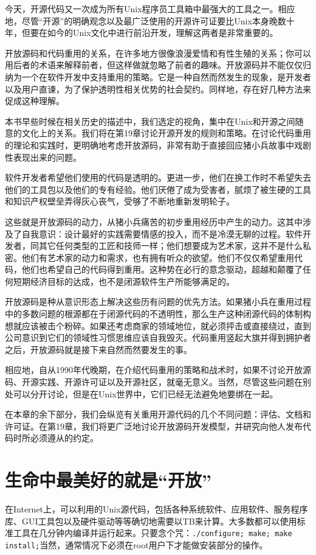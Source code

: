 \documentclass[12pt,oneside]{book}
\begin{document}
\begin{common-format}
今天，开源代码又一次成为所有Unix程序员工具箱中最强大的工具之一。相应地，尽管“开源”的明确观念以及最广泛使用的开源许可证要比Unix本身晚数十年，但要在如今的Unix文化中进行前沿开发，理解这两者是非常重要的。

开放源码和代码重用的关系，在许多地方很像浪漫爱情和有性生殖的关系；你可以用后者的术语来解释前者，但这样做就忽略了前者的趣味。开放源码并不能仅仅归纳为一个在软件开发中支持重用的策略。它是一种自然而然发生的现象，是开发者以及用户直谏，为了保护透明性相关优势的社会契约。同样地，存在好几种方法来促成这种理解。

本书早些时候在相关历史的描述中，我们选定的视角，集中在Unix和开源之间随意的文化上的关系。我们将在第19章讨论开源开发的规则和策略。在讨论代码重用的理论和实践时，更明确地考虑开放源码，非常有助于直接回应猪小兵故事中戏剧性表现出来的问题。

软件开发者希望他们使用的代码是透明的。更进一步，他们在换工作时不希望失去他们的工具包以及他们的专有经验。他们厌倦了成为受害者，腻烦了被生硬的工具和知识产权壁垒弄得灰心丧气，受够了不断地重新发明轮子。

这些就是开放源码的动力，从猪小兵痛苦的初步重用经历中产生的动力。这其中涉及了自我意识：设计最好的实践需要情感的投入，而不是冷漠无聊的过程。软件开发者，同其它任何类型的工匠和技师一样；他们想要成为艺术家，这并不是什么私密。他们有艺术家的动力和需求，也有拥有听众的欲望。他们不仅仅希望重用代码，他们也希望自己的代码得到重用。这种势在必行的意念驱动，超越和颠覆了任何短期经济目标的达成，也不是闭源软件生产所能够满足的。

开放源码是种从意识形态上解决这些历有问题的优先方法。如果猪小兵在重用过程中的多数问题的根源都在于闭源代码的不透明性，那么生产这种闭源代码的体制构想就应该被击个粉碎。如果还考虑商家的领域地位，就必须抨击或直接绕过，直到公司意识到它们的领域性习惯思维应该自我毁灭。代码重用竖起大旗并得到拥护者之后，开放源码就是接下来自然而然要发生的事。

相应地，自从1990年代晚期，在介绍代码重用的策略和战术时，如果不讨论开放源码、开源实践、开源许可证以及开源社区，就毫无意义。当然，尽管这些问题在别处可以分开讨论，但是在Unix世界中，它们已经无法避免地要绑在一起。

在本章的余下部分，我们会纵览有关重用开源代码的几个不同问题：评估、文档和许可证。在第19章，我们将更广泛地讨论开放源码开发模型，并研究向他人发布代码时所必须遵从的约定。

\section{生命中最美好的就是“开放”}
在Internet上，可以利用的Unix源代码，包括各种系统软件、应用软件、服务程序库、GUI工具包以及硬件驱动等等确切地需要以TB来计算。大多数都可以使用标准工具在几分钟内编译并运行起来。只要念个咒：\verb+./configure; make; make install;+当然，通常情况下必须在root用户下才能做安装部分的操作。


\end{common-format}
\end{document}
